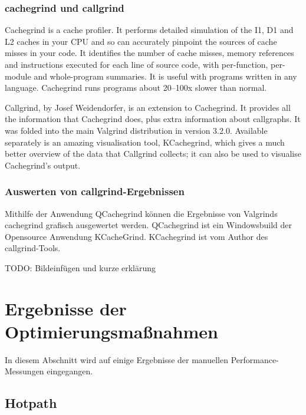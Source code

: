 \subsubsection{cachegrind und callgrind}
Cachegrind is a cache profiler. It performs detailed simulation of the I1, D1 and L2 caches in your CPU and so can accurately pinpoint the sources of cache misses in your code. It identifies the number of cache misses, memory references and instructions executed for each line of source code, with per-function, per-module and whole-program summaries. It is useful with programs written in any language. Cachegrind runs programs about 20--100x slower than normal.

Callgrind, by Josef Weidendorfer, is an extension to Cachegrind. It provides all the information that Cachegrind does, plus extra information about callgraphs. It was folded into the main Valgrind distribution in version 3.2.0. Available separately is an amazing visualisation tool, KCachegrind, which gives a much better overview of the data that Callgrind collects; it can also be used to visualise Cachegrind's output.


\subsubsection{Auswerten von callgrind-Ergebnissen}

Mithilfe der Anwendung QCachegrind können die Ergebnisse von Valgrinds cachegrind grafisch ausgewertet werden. QCachegrind ist ein Windowsbuild der Opensource Anwendung KCacheGrind.
KCachegrind ist vom Author des callgrind-Tools\cite{kcachegrind}.

TODO: Bildeinfügen und kurze erklärung


\section{Ergebnisse der Optimierungsmaßnahmen}

In diesem Abschnitt wird auf einige Ergebnisse der manuellen Performance-Messungen eingegangen.

\subsection{Hotpath}

